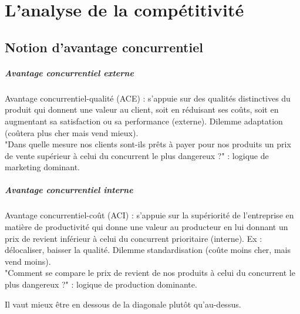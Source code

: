 
\chapter{L'analyse de la compétitivité}

	\section{Notion d'avantage concurrentiel}
	
	\paragraph{Avantage concurrentiel externe}
	Avantage concurrentiel-qualité (ACE) : s'appuie sur des qualités distinctives du produit qui donnent une valeur au client, soit en réduisant ses coûts, soit en augmentant sa satisfaction ou sa performance (externe). Dilemme adaptation (coûtera plus cher mais vend mieux).\\
	
	"Dans quelle mesure nos clients sont-ils prêts à payer pour nos produits un prix de vente supérieur à celui du concurrent le plus dangereux ?" : logique de marketing dominant.
	
	\paragraph{Avantage concurrentiel interne}
	Avantage concurrentiel-coût (ACI) : s'appuie sur la supériorité de l'entreprise en matière de productivité qui donne une valeur au producteur en lui donnant un prix de revient inférieur à celui du concurrent prioritaire (interne). Ex : délocaliser, baisser la qualité. Dilemme standardisation (coûte moins cher, mais vend moins). \\
	
	"Comment se compare le prix de revient de nos produits à celui du concurrent le plus dangereux ?" : logique de production dominante.	
	
		
	
	

		
	Il vaut mieux être en dessous de la diagonale plutôt qu'au-dessus.
		
